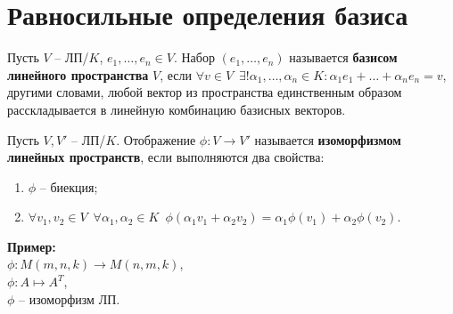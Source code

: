 
\section{Равносильные определения базиса}

\begin{conj}
    Пусть $V$ -- ЛП/$K$, $e_1, \dots, e_n \in V$.
    Набор $(e_1, \dots, e_n)$ называется \textbf{базисом линейного 
    пространства} $V$, если $\forall v \in V \,\,\, \exists! \alpha_1,
    \dots, \alpha_n \in K : \alpha_1 e_1 + \dots + \alpha_n e_n = v$,
    другими словами, любой вектор из пространства единственным образом
    расскладывается в линейную комбинацию базисных векторов.
\end{conj}

\begin{conj}
    Пусть $V, V'$ -- ЛП/$K$. Отображение $\phi : V \to V'$
    называется \textbf{изоморфизмом линейных пространств}, если
    выполняются два свойства:
    \begin{enumerate}
        \item $\phi$ -- биекция;
        \item $\forall v_1, v_2 \in V \,\,\, \forall \alpha_1, \alpha_2
        \in K \,\,\, \phi(\alpha_1 v_1 + \alpha_2 v_2) = \alpha_1
        \phi (v_1) + \alpha_2 \phi(v_2)$.
    \end{enumerate}
\end{conj}

$ $\\
\textbf{Пример:}\\
$\phi : M(m, n, k) \to M(n, m, k)$,\\
$\phi : A \mapsto A^T$, \\
$\phi$ -- изоморфизм ЛП.

